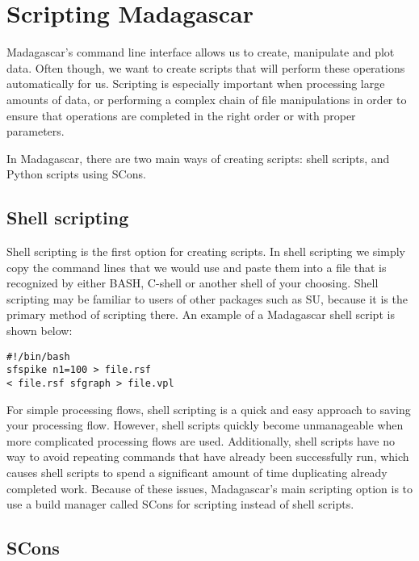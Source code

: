 \section{Scripting Madagascar}

Madagascar's command line interface allows us to create, manipulate and plot data.  Often though, we want to create scripts that will perform these operations automatically for us.  Scripting is especially important when processing large amounts of data, or performing a complex chain of file manipulations in order to ensure that operations are completed in the right order or with proper parameters.

In Madagascar, there are two main ways of creating scripts: shell scripts, and Python scripts using SCons.  

\subsection{Shell scripting}

Shell scripting is the first option for creating scripts.  In shell scripting we simply copy the command lines that we would use and paste them into a file that is recognized by either BASH, C-shell or another shell of your choosing.  Shell scripting may be familiar to users of other packages such as SU, because it is the primary method of scripting there.  An example of a Madagascar shell script is shown below:

\begin{verbatim}
#!/bin/bash
sfspike n1=100 > file.rsf
< file.rsf sfgraph > file.vpl
\end{verbatim}

For simple processing flows, shell scripting is a quick and easy approach to saving your processing flow.  However, shell scripts quickly become unmanageable when more complicated processing flows are used.  Additionally, shell scripts have no way to avoid repeating commands that have already been successfully run, which causes shell scripts to spend a significant amount of time duplicating already completed work.  Because of these issues, Madagascar's main scripting option is to use a build manager called SCons for scripting instead of shell scripts.

\subsection{SCons}

